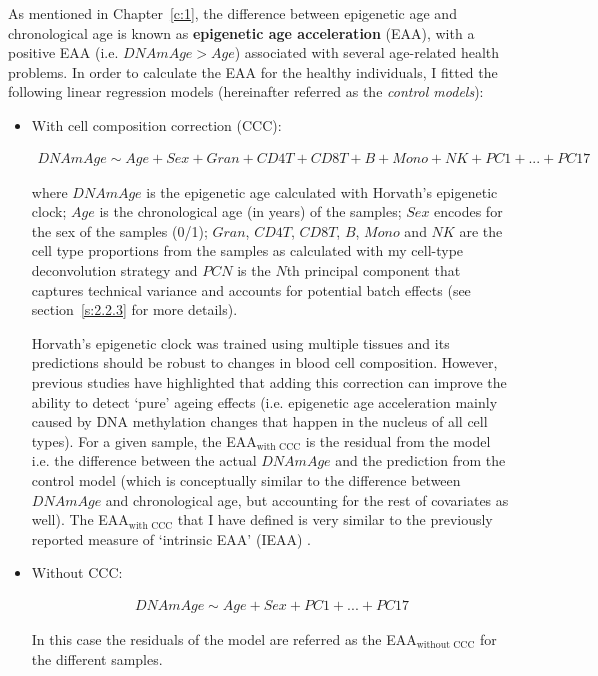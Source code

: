 \bigskip

As mentioned in Chapter~\ref{c:1}, the difference between epigenetic age and chronological age is known as \textbf{epigenetic age acceleration} (\acrshort{EAA}), with a positive EAA (i.e. $DNAmAge > Age$) associated with several age-related health problems. In order to calculate the EAA for the healthy individuals, I fitted the following linear regression models (hereinafter referred as the \textit{control models}):

\begin{itemize}
	
	\item With cell composition correction (CCC):
	
	\begin{align} \label{eq:2.16}
	 DNAmAge \sim Age + Sex+ Gran + CD4T + CD8T + B + Mono + NK + PC1 + ... + PC17
	\end{align}
	
	where $DNAmAge$ is the epigenetic age calculated with Horvath's epigenetic clock; $Age$ is the chronological age (in years) of the samples; $Sex$ encodes for the sex of the samples (0/1); $Gran$, $CD4T$, $CD8T$, $B$, $Mono$ and $NK$ are the cell type proportions from the samples as calculated with my cell-type deconvolution strategy and $PCN$ is the $N$th principal component that captures technical variance and accounts for potential batch effects (see section~\ref{s:2.2.3} for more details). 
	
	Horvath's epigenetic clock was trained using multiple tissues and its predictions should be robust to changes in blood cell composition. However, previous studies have highlighted that adding this correction can improve the ability to detect `pure' ageing effects \cite{Horvath2016, Chen2016} (i.e. epigenetic age acceleration mainly caused by DNA methylation changes that happen in the nucleus of all cell types). For a given sample, the EAA$_{\text{with CCC}}$ is the residual from the model i.e. the difference between the actual $DNAmAge$ and the prediction from the control model (which is conceptually similar to the difference between $DNAmAge$ and chronological age, but accounting for the rest of covariates as well). The EAA$_{\text{with CCC}}$ that I have defined is very similar to the previously reported measure of `intrinsic EAA' (\acrshort{IEAA}) \cite{Horvath2016, Chen2016}.
	
	\item Without CCC:
	
	\begin{align} \label{eq:2.17}
	DNAmAge \sim Age + Sex+ PC1 + ... + PC17
	\end{align}
	
	In this case the residuals of the model are referred as the EAA$_{\text{without CCC}}$ for the different samples.
	
\end{itemize}


